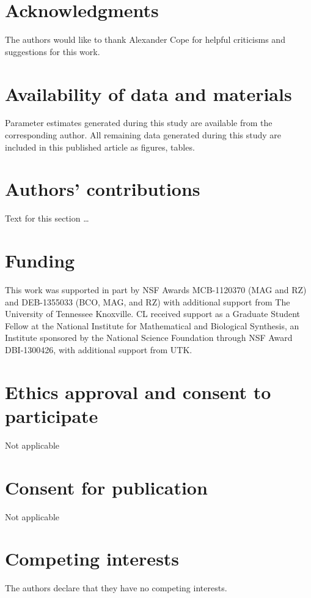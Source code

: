 \documentclass{bmcart}
\begin{document}
\begin{backmatter}
  
\section*{Acknowledgments}
The authors would like to thank Alexander Cope for helpful criticisms and suggestions for this work.

\section*{Availability of data and materials}
Parameter estimates generated during this study are available from the corresponding author.
All remaining data generated during this study are included in this published article as figures, tables.

\section*{Authors' contributions}
Text for this section \ldots
    
\section*{Funding}
This work was supported in part by NSF Awards MCB-1120370 (MAG and RZ) and DEB-1355033 (BCO, MAG, and RZ) with additional support from The University of Tennessee Knoxville. 
CL received support as a Graduate Student Fellow at the National Institute for Mathematical and Biological Synthesis, an Institute sponsored by the National Science Foundation through NSF Award DBI-1300426, with additional support from UTK. 

\section*{Ethics approval and consent to participate}
Not applicable

\section*{Consent for publication}
Not applicable

\section*{Competing interests}
The authors declare that they have no competing interests.




\end{backmatter}
\end{document}
